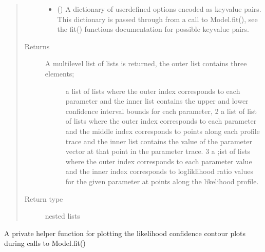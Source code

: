 \documentclass[letterpaper,10pt,english,openany,oneside]{sphinxmanual}
\begin{document}
\begin{fulllineitems}
\begin{fulllineitems}
\begin{quote}
\begin{description}
\begin{itemize}
\item {} 
 () \textendash{} A dictionary of user\sphinxhyphen{}defined options encoded as key\sphinxhyphen{}value
pairs. This dictionary is passed through from a call to Model.fit(), see
the fit() functions documentation for possible key\sphinxhyphen{}value pairs.

\end{itemize}

\item[{Returns}] \leavevmode
\begin{description}
\item[{A multi\sphinxhyphen{}level list of lists is returned, the outer list contains three elements;}]  \sphinxhyphen{} a list of lists where the outer index corresponds to each parameter and the
inner list contains the upper and lower confidence interval bounds for each parameter,
2 \sphinxhyphen{} a list of list of lists where the outer index corresponds to each parameter and
the middle index corresponds to points along each profile trace and the inner list
contains the value of the parameter vector at that point in the parameter trace.
3 \sphinxhyphen{} a ;ist of lists where the outer index corresponds to each parameter value and
the inner index corresponds to logliklihood ratio values for the given parameter
at points along the likelihood profile.

\end{description}


\item[{Return type}] \leavevmode
nested lists

\end{description}\end{quote}

\end{fulllineitems}


\begin{fulllineitems}
\label{\detokenize{nloed:nloed.model.Model.__contour_plot}}
A private helper function for plotting the likelihood confidence contour plots during
calls to Model.fit()


\end{fulllineitems}
\end{fulllineitems}
\end{document}
